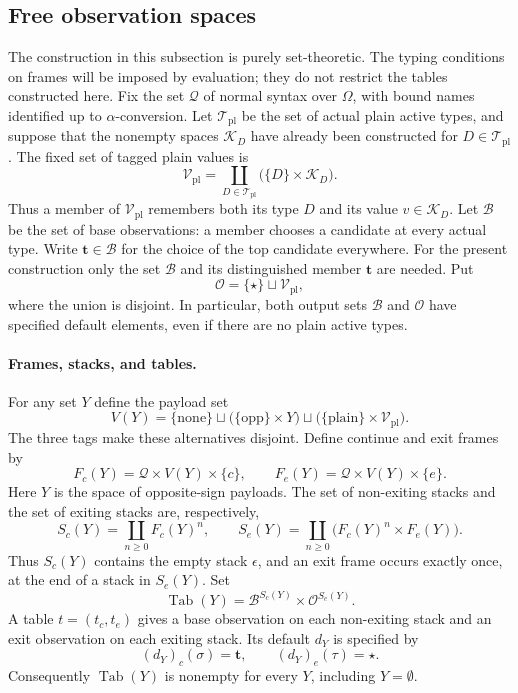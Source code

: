 \subsection{Free observation spaces}
\label{obs:free-spaces}

The construction in this subsection is purely set-theoretic.  The typing
conditions on frames will be imposed by evaluation; they do not restrict
the tables constructed here.  Fix the set $\mathcal Q$ of normal syntax
over $\Omega$, with bound names identified up to $\alpha$-conversion.
Let $\mathcal T_{\mathrm{pl}}$ be the set of actual plain active types,
and suppose that the nonempty spaces $\mathcal K_D$ have already been
constructed for $D\in\mathcal T_{\mathrm{pl}}$.  The fixed set of tagged
plain values is
\begin{equation}
  \mathcal V_{\mathrm{pl}}
   =\coprod_{D\in\mathcal T_{\mathrm{pl}}}
       \bigl(\{D\}\times\mathcal K_D\bigr).
  \label{obs:free-plain-values}
\end{equation}
Thus a member of $\mathcal V_{\mathrm{pl}}$ remembers both its type $D$ and its value
$v\in\mathcal K_D$.  Let $\mathcal B$ be the set of base observations:
a member chooses a candidate at every actual type.  Write
$\mathbf t\in\mathcal B$ for the choice of the top candidate everywhere.
For the present construction only the set $\mathcal B$ and its
distinguished member $\mathbf t$ are needed.  Put
\[
  \mathcal O=\{\star\}\sqcup\mathcal V_{\mathrm{pl}},
\]
where the union is disjoint.  In particular, both output sets
$\mathcal B$ and $\mathcal O$ have specified default elements, even if
there are no plain active types.

\paragraph{Frames, stacks, and tables.}
For any set $Y$ define the payload set
\[
  V(Y)
   =\{\mathrm{none}\}
      \sqcup\bigl(\{\mathrm{opp}\}\times Y\bigr)
      \sqcup\bigl(\{\mathrm{plain}\}\times\mathcal V_{\mathrm{pl}}\bigr).
\]
The three tags make these alternatives disjoint.  Define continue and
exit frames by
\[
  F_c(Y)=\mathcal Q\times V(Y)\times\{c\},
  \qquad
  F_e(Y)=\mathcal Q\times V(Y)\times\{e\}.
\]
Here $Y$ is the space of opposite-sign payloads.  The set of non-exiting
stacks and the set of exiting stacks are, respectively,
\begin{equation}
  S_c(Y)=\coprod_{n\geq 0} F_c(Y)^n,
  \qquad
  S_e(Y)=\coprod_{n\geq 0}
                 \bigl(F_c(Y)^n\times F_e(Y)\bigr).
  \label{obs:free-stacks}
\end{equation}
Thus $S_c(Y)$ contains the empty stack $\epsilon$, and an exit frame
occurs exactly once, at the end of a stack in $S_e(Y)$.  Set
\begin{equation}
  \operatorname{Tab}(Y)
      =\mathcal B^{S_c(Y)}\times\mathcal O^{S_e(Y)}.
  \label{obs:free-tab}
\end{equation}
A table $t=(t_c,t_e)$ gives a base observation on each non-exiting
stack and an exit observation on each exiting stack.  Its default
$d_Y$ is specified by
\[
  (d_Y)_c(\sigma)=\mathbf t,
  \qquad
  (d_Y)_e(\tau)=\star.
\]
Consequently $\operatorname{Tab}(Y)$ is nonempty for every $Y$,
including $Y=\emptyset$.

